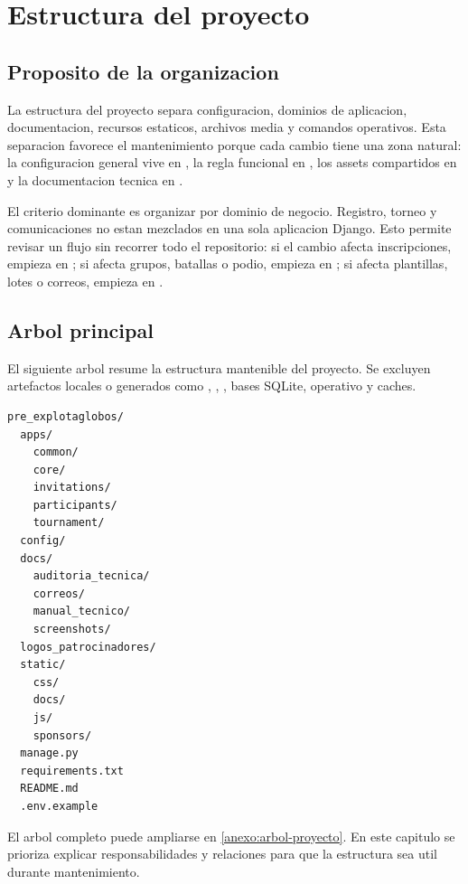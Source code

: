 \chapter{Estructura del proyecto}
\label{chap:estructura-proyecto}

\section{Proposito de la organizacion}
\label{sec:estructura-proposito}

La estructura del proyecto separa configuracion, dominios de aplicacion, documentacion, recursos estaticos, archivos media y comandos operativos. Esta separacion favorece el mantenimiento porque cada cambio tiene una zona natural: la configuracion general vive en , la regla funcional en , los assets compartidos en  y la documentacion tecnica en .

El criterio dominante es organizar por dominio de negocio. Registro, torneo y comunicaciones no estan mezclados en una sola aplicacion Django. Esto permite revisar un flujo sin recorrer todo el repositorio: si el cambio afecta inscripciones, empieza en ; si afecta grupos, batallas o podio, empieza en ; si afecta plantillas, lotes o correos, empieza en .

\section{Arbol principal}
\label{sec:estructura-arbol}

El siguiente arbol resume la estructura mantenible del proyecto. Se excluyen artefactos locales o generados como , , , bases SQLite,  operativo y caches.

\begin{lstlisting}[caption={Arbol principal del proyecto},label={lst:estructura-arbol-principal}]
pre_explotaglobos/
  apps/
    common/
    core/
    invitations/
    participants/
    tournament/
  config/
  docs/
    auditoria_tecnica/
    correos/
    manual_tecnico/
    screenshots/
  logos_patrocinadores/
  static/
    css/
    docs/
    js/
    sponsors/
  manage.py
  requirements.txt
  README.md
  .env.example
\end{lstlisting}

El arbol completo puede ampliarse en \cref{anexo:arbol-proyecto}. En este capitulo se prioriza explicar responsabilidades y relaciones para que la estructura sea util durante mantenimiento.

